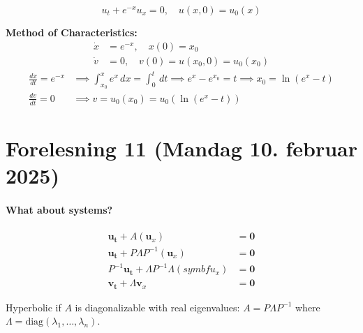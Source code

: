 \begin{example}{}{}

  \[
    u_t + e^{-x}u_x = 0, \quad u(x,0) = u_0(x)
  \]

  \textbf{Method of Characteristics:}
  \begin{align*}
    \dot{x} & = e^{-x}, \quad x(0) = x_0             \\
    \dot{v} & = 0, \quad v(0) = u(x_0, 0) = u_0(x_0)
  \end{align*}
  \begin{align*}
    \frac{dx}{dt} = e^{-x} & \implies \int_{x_0}^x e^x \, dx = \int_0^t \, dt \implies e^x - e^{x_0} = t \implies x_0 = \ln(e^x - t) \\
    \frac{dv}{dt} = 0      & \implies v = u_0(x_0) = u_0(\ln(e^x - t))
  \end{align*}

\end{example}
\section{Forelesning 11 (Mandag 10. februar 2025)}

\paragraph{What about systems?}

\begin{align*}
  \symbf{u_t} + A(\symbf{u}_x)                          & = \symbf{0} \\
  \symbf{u_t} + P\Lambda P^{-1}(\symbf{u}_x)            & = \symbf{0} \\
  P^{-1}\symbf{u_t} + \Lambda P^{-1}\Lambda(symbf{u}_x) & = \symbf{0} \\
  \symbf{v_t} + \Lambda \symbf{v}_x                     & = \symbf{0}
\end{align*}

Hyperbolic if \(A\) is diagonalizable with real eigenvalues: \(A = P\Lambda P^{-1}\) where \(\Lambda = \text{diag}(\lambda_1, \ldots, \lambda_n)\).


